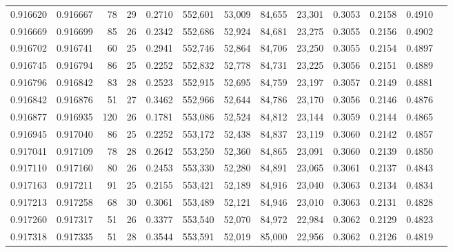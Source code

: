 \begin{tabular}{rrrrrrrrrrrrr}
0.916620 & 0.916667 &    78 &  29 &                                     0.2710 & 552,601 &  53,009 &  84,655 &  23,301 & 0.3053 & 0.2158 & 0.4910 \\
0.916669 & 0.916699 &    85 &  26 &                                     0.2342 & 552,686 &  52,924 &  84,681 &  23,275 & 0.3055 & 0.2156 & 0.4902 \\
0.916702 & 0.916741 &    60 &  25 &                                     0.2941 & 552,746 &  52,864 &  84,706 &  23,250 & 0.3055 & 0.2154 & 0.4897 \\
0.916745 & 0.916794 &    86 &  25 &                                     0.2252 & 552,832 &  52,778 &  84,731 &  23,225 & 0.3056 & 0.2151 & 0.4889 \\
0.916796 & 0.916842 &    83 &  28 &                                     0.2523 & 552,915 &  52,695 &  84,759 &  23,197 & 0.3057 & 0.2149 & 0.4881 \\
0.916842 & 0.916876 &    51 &  27 &                                     0.3462 & 552,966 &  52,644 &  84,786 &  23,170 & 0.3056 & 0.2146 & 0.4876 \\
0.916877 & 0.916935 &   120 &  26 &                                     0.1781 & 553,086 &  52,524 &  84,812 &  23,144 & 0.3059 & 0.2144 & 0.4865 \\
0.916945 & 0.917040 &    86 &  25 &                                     0.2252 & 553,172 &  52,438 &  84,837 &  23,119 & 0.3060 & 0.2142 & 0.4857 \\
0.917041 & 0.917109 &    78 &  28 &                                     0.2642 & 553,250 &  52,360 &  84,865 &  23,091 & 0.3060 & 0.2139 & 0.4850 \\
0.917110 & 0.917160 &    80 &  26 &                                     0.2453 & 553,330 &  52,280 &  84,891 &  23,065 & 0.3061 & 0.2137 & 0.4843 \\
0.917163 & 0.917211 &    91 &  25 &                                     0.2155 & 553,421 &  52,189 &  84,916 &  23,040 & 0.3063 & 0.2134 & 0.4834 \\
0.917213 & 0.917258 &    68 &  30 &                                     0.3061 & 553,489 &  52,121 &  84,946 &  23,010 & 0.3063 & 0.2131 & 0.4828 \\
0.917260 & 0.917317 &    51 &  26 &                                     0.3377 & 553,540 &  52,070 &  84,972 &  22,984 & 0.3062 & 0.2129 & 0.4823 \\
0.917318 & 0.917335 &    51 &  28 &                                     0.3544 & 553,591 &  52,019 &  85,000 &  22,956 & 0.3062 & 0.2126 & 0.4819 \\

\end{tabular}

